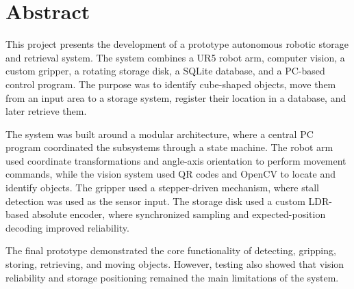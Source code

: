 \section{Abstract}



This project presents the development of a prototype autonomous robotic storage and retrieval system. The system combines a UR5 robot arm, computer vision, a custom gripper, a rotating storage disk, a SQLite database, and a PC-based control program. The purpose was to identify cube-shaped objects, move them from an input area to a storage system, register their location in a database, and later retrieve them.

The system was built around a modular architecture, where a central PC program coordinated the subsystems through a state machine. The robot arm used coordinate transformations and angle-axis orientation to perform movement commands, while the vision system used QR codes and OpenCV to locate and identify objects. The gripper used a stepper-driven mechanism, where stall detection was used as the sensor input. The storage disk used a custom LDR-based absolute encoder, where synchronized sampling and expected-position decoding improved reliability.

The final prototype demonstrated the core functionality of detecting, gripping, storing, retrieving, and moving objects. However, testing also showed that vision reliability and storage positioning remained the main limitations of the system.